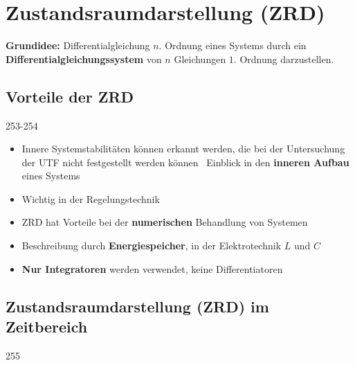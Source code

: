 \section{Zustandsraumdarstellung (ZRD)}

\textbf{Grundidee:} Differentialgleichung $n.$ Ordnung eines Systems durch ein \textbf{Differentialgleichungssystem} 
von $n$ Gleichungen $1.$ Ordnung darzustellen.


\subsection{Vorteile der ZRD}{253-254}

\begin{itemize}
    \item Innere Systemstabilitäten können erkannt werden, die bei der Untersuchung der UTF 
        nicht festgestellt werden können \textrightarrow\ Einblick in den \textbf{inneren Aufbau} eines Systems
    \item Wichtig in der Regelungstechnik
    \item ZRD hat Vorteile bei der \textbf{numerischen} Behandlung von Systemen
    \item Beschreibung durch \textbf{Energiespeicher}, in der Elektrotechnik $L$ und $C$
    \item \textbf{Nur Integratoren} werden verwendet, keine Differentiatoren
\end{itemize}


\subsection{Zustandsraumdarstellung (ZRD) im Zeitbereich}{255}
\label{ZRD Zeitbereich}

